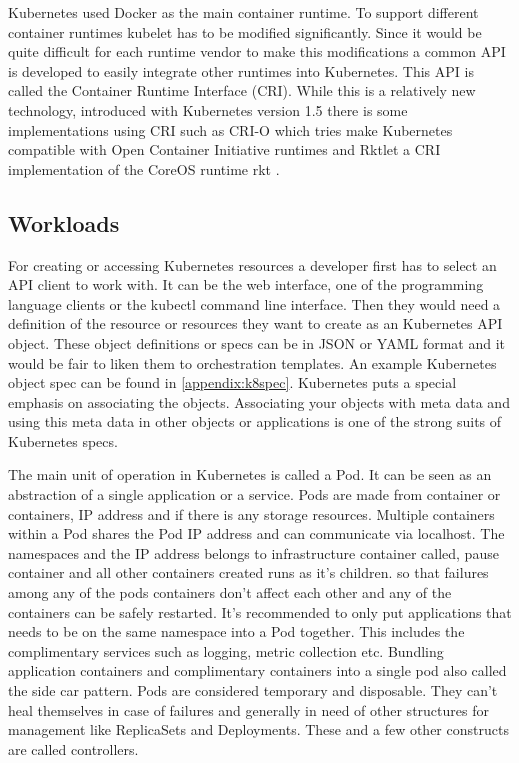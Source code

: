 \documentclass[12pt,oneandhalf,chaparabic,ceng,ms,eng,oneside,pntc]{gsufbe}
\begin{document}
Kubernetes used Docker as the main container runtime. To support different container runtimes kubelet
has to be modified significantly. Since it would be quite difficult for each runtime vendor to make
this modifications a common API is developed to easily integrate other runtimes into Kubernetes. This
API is called the Container Runtime Interface (CRI). While this is a relatively new technology,
introduced with Kubernetes version 1.5 there is some implementations using CRI such as CRI-O \cite{crio} which
tries make Kubernetes compatible with Open Container Initiative runtimes and Rktlet a CRI
implementation of the CoreOS runtime rkt \cite{rkt}.

\subsection{Workloads}
For creating or accessing Kubernetes resources a developer first has to select an API client to work
with. It can be the web interface, one of the programming language clients or the kubectl command line
interface. Then they would need a definition of the resource or resources they want to create as an
Kubernetes API object. These object definitions or specs can be in JSON or YAML format and it would be
fair to liken them to orchestration templates. An example Kubernetes object spec can be found in
\ref{appendix:k8spec}. Kubernetes puts a special emphasis on associating the objects. Associating your
objects with meta data and using this meta data in other objects or applications is one of the strong
suits of Kubernetes specs.

The main unit of operation in Kubernetes is called a Pod. It can be seen as an abstraction of a single
application or a service. Pods are made from container or containers, IP address and if there is any
storage resources. Multiple containers within a Pod shares the Pod IP address and can communicate via
localhost. The namespaces and the IP address belongs to infrastructure container called, pause 
container and all other containers created runs as it’s children. so that failures among any of the 
pods containers don't affect each other and any of the containers can be safely restarted. 
\cite{sayfan_mastering_2018} It's 
recommended to only put applications that needs to be on the same namespace into a Pod together. This
includes the complimentary services such as logging, metric collection etc. Bundling application
containers and complimentary containers into a single pod also called the side car pattern. Pods are
considered temporary and disposable. They can’t heal themselves in case of failures and generally in
need of other structures for management like ReplicaSets and Deployments. These and a few other
constructs are called controllers.
\end{document}
